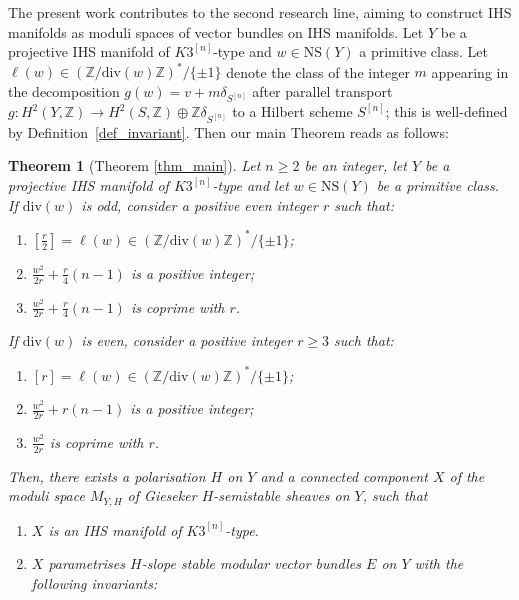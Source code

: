 \documentclass[12pt,a4paper]{amsart}
\theoremstyle{plain}
\newtheorem{mainthm}{Theorem}
\theoremstyle{definition}
\theoremstyle{remark}
\def\Z{\mathbb{Z}}
\def\H{H}
\newcommand{\ZZ}{\mathbb{Z}}
\newcommand{\NS}{\mathrm{NS}}
\newcommand{\dv}{\mathrm{div}}
\begin{document}
The present work contributes to the second research line, aiming to construct IHS manifolds as moduli spaces of vector bundles on IHS manifolds. Let $Y$ be a projective IHS manifold of $K3^{[n]}$-type and $w\in \NS(Y)$ a primitive class. Let $\ell(w)\in(\mathbb{Z}/\dv(w)\mathbb{Z})^*/\{\pm1\}$ denote the class of the integer $m$ appearing in the decomposition $g(w)=v+m\delta_{S^{[n]}}$ after parallel transport $g\colon \H^2(Y,\ZZ)\to \H^2(S,\ZZ)\oplus \ZZ \delta_{S^{[n]}}$ to a Hilbert scheme $S^{[n]}$; this is well-defined by Definition~\ref{def_invariant}. Then our main Theorem reads as follows:
\begin{mainthm}[Theorem \ref{thm_main}] \label{thm_main_intro}Let $n\geq 2$ be an integer, let $Y$ be a projective IHS manifold of $K3^{[n]}$-type and let $w \in \NS(Y)$ be a primitive class. If $\dv(w)$ is odd, consider a positive even integer $r$ such that: \begin{enumerate}[label=(\alph*)]
    \item [{\normalfont{(a)}}]  $\left[\frac{r}{2}\right]=\ell(w)\in (\Z/\dv(w)\Z)^*/\{\pm 1\}$;
    \item [{\normalfont{(b)}}] $\frac{w^2}{2r}+ \frac{r}{4}(n-1)$ is a positive integer;
    \item [{\normalfont{(c)}}] $\frac{w^2}{2r}+ \frac{r}{4}(n-1)$ is coprime with $r$.
\end{enumerate}
If $\dv(w)$ is even, consider a positive integer $r\geq 3$ such that:
\begin{enumerate}[label=(\alph*')]
    \item [{\normalfont{(a')}}]  $[r]=\ell(w)\in (\Z/\dv(w)\Z)^*/\{\pm 1\}$;
    \item [{\normalfont{(b')}}] $\frac{w^2}{2r} + r(n-1)$ is a positive integer;
    \item [{\normalfont{(c')}}] $\frac{w^2}{2r}$ is coprime with $r$.
\end{enumerate}
Then, there exists a polarisation $H$ on $Y$ and a connected component $X$ of the moduli space $M_{Y,H}$ of Gieseker $H$-semistable sheaves on $Y$, such that 
\begin{enumerate}[label=$\bullet$]
    \item $X$ is an IHS manifold of $K3^{[n]}$-type.

    \item $X$ parametrises $H$-slope stable modular vector bundles $E$ on $Y$ with the following invariants:


\end{enumerate}
\end{mainthm}
\end{document}
